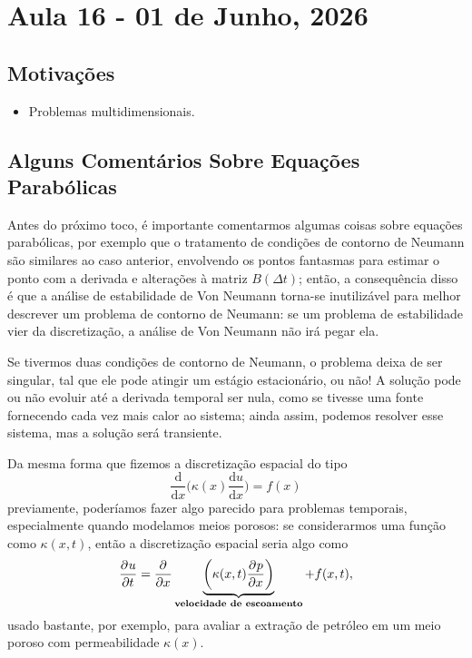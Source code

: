 \documentclass[../differential_methods.tex]{subfiles}
\begin{document}
\section{Aula 16 - 01 de Junho, 2026}
\subsection{Motivações}
\begin{itemize}
	\item Problemas multidimensionais.
\end{itemize}
\subsection{Alguns Comentários Sobre Equações Parabólicas}
Antes do próximo toco, é importante comentarmos algumas coisas sobre equações parabólicas, por exemplo que o tratamento de condições de contorno de Neumann são similares ao caso anterior, envolvendo os pontos fantasmas para estimar o ponto com a derivada e alterações à matriz \(B(\Delta t)\); então, a consequência disso é que a análise de estabilidade de Von Neumann torna-se inutilizável para melhor descrever um problema de contorno de Neumann: se um problema de estabilidade vier da discretização, a análise de Von Neumann não irá pegar ela.

Se tivermos duas condições de contorno de Neumann, o problema deixa de ser singular, tal que ele pode atingir um estágio estacionário, ou não! A solução pode ou não evoluir até a derivada temporal ser nula, como se tivesse uma fonte fornecendo cada vez mais calor ao sistema; ainda assim, podemos resolver esse sistema, mas a solução será transiente.

Da mesma forma que fizemos a discretização espacial do tipo
\[
	\frac{\mathrm{d}}{\mathrm{d}x}\biggl(\kappa (x)\frac{\mathrm{d}u}{\mathrm{d}x}\biggr) = f(x)
\]
previamente, poderíamos fazer algo parecido para problemas temporais, especialmente quando modelamos meios porosos: se considerarmos uma função como \(\kappa(x, t)\), então a discretização espacial seria algo como
\[
	\frac{\partial^{}u}{\partial t^{}} = \frac{\partial^{}}{\partial x^{}}\underbrace{\biggl(\kappa (x, t)\frac{\partial^{}p}{\partial x^{}}\biggr)}_{\text{\textbf{velocidade de escoamento}}} + f(x, t),
\]
usado bastante, por exemplo, para avaliar a extração de petróleo em um meio poroso com permeabilidade \(\kappa (x).\)
\end{document}
